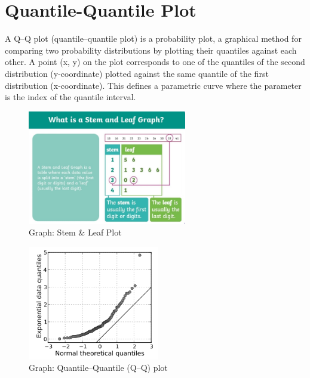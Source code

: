 \section{Quantile-Quantile Plot \cite{wiki-q-q-plot}}\label{Quantile-Quantile Plot}
A Q–Q plot (quantile–quantile plot) is a probability plot, a graphical method for comparing two probability distributions by plotting their quantiles against each other. A point (x, y) on the plot corresponds to one of the quantiles of the second distribution (y-coordinate) plotted against the same quantile of the first distribution (x-coordinate). This defines a parametric curve where the parameter is the index of the quantile interval.

\begin{table}[H]
    \begin{minipage}{0.45\textwidth}
        \begin{figure}[H]
            \includegraphics[height=5cm]{Pictures/data/data_stem-and-leaf-plot.jpg}
            \caption{Graph: Stem \& Leaf Plot}
        \end{figure}
    \end{minipage}
    \hfill
    \begin{minipage}{0.45\textwidth}
        \begin{figure}[H]
            \includegraphics[height=5cm]{Pictures/data/data_q_q_plot.png}
            \caption{Graph: Quantile–Quantile (Q–Q) plot}
        \end{figure}
    \end{minipage}
\end{table}
